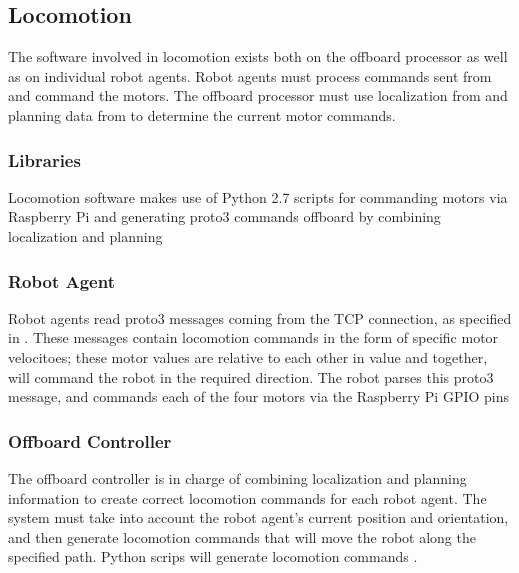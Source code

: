 
\subsection{Locomotion}
\label{sec:software_locomotion}
The software involved in locomotion exists both on the offboard processor as well as on individual robot agents. Robot agents must process commands sent from  and command the motors. The offboard processor must use localization from  and planning data from  to determine the current motor commands.

\subsubsection{Libraries}
\label{sec:software_locomotion_libs}
Locomotion software makes use of Python 2.7 scripts \cite{python27} for commanding motors via Raspberry Pi \cite{python_rpigpio} and generating proto3 commands offboard by combining localization and planning

\subsubsection{Robot Agent}
\label{sec:software_locomotion_robot}
Robot agents read proto3 messages coming from the TCP connection, as specified in . These messages contain locomotion commands in the form of specific motor velocitoes; these motor values are relative to each other in value and together, will command the robot in the required direction. The robot parses this proto3 message, and commands each of the four motors via the Raspberry Pi GPIO pins \cite{python_rpigpio}

\subsubsection{Offboard Controller}
\label{sec:software_locomotion_offboard}
The offboard controller is in charge of combining localization and planning information to create correct locomotion commands for each robot agent. The system must take into account the robot agent's current position and orientation, and then generate locomotion commands that will move the robot along the specified path. Python scrips will generate locomotion commands \cite{python27}.

